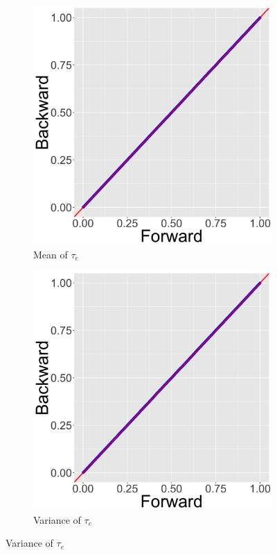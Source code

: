 \documentclass[ba]{imsart}
\numberwithin{equation}{section}
\theoremstyle{plain}
\begin{document}
\begin{figure}[!t]
\begin{subfigure}[b]{0.2425\textwidth}
		\end{subfigure}
		\begin{subfigure}[b]{0.2425\textwidth}
			\caption{Mean of $\tau_e$}
			\includegraphics[width=\textwidth]{img/plot3.png}	
		\end{subfigure}
		\begin{subfigure}[b]{0.2425\textwidth}
			\caption{Variance of $\tau_e$}
			\includegraphics[width=\textwidth]{img/plot4.png}	

\end{subfigure}
\end{figure}
\end{document}
